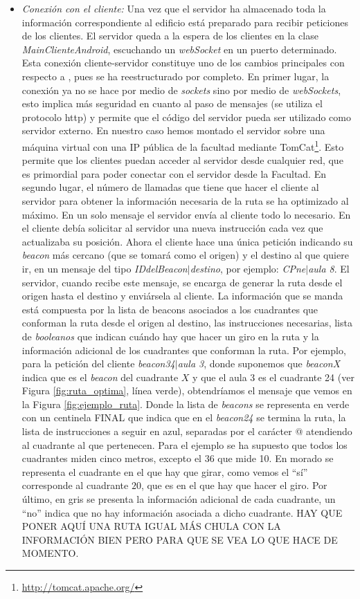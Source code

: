 \begin{itemize}
	\item \textit{Conexión con el cliente:} Una vez que el servidor ha almacenado toda la información correspondiente al edificio está preparado para recibir peticiones de los clientes. El servidor queda a la espera de los clientes en la clase \textit{MainClienteAndroid}, escuchando un \textit{webSocket} en un puerto determinado. Esta conexión cliente-servidor constituye uno de los cambios principales con respecto a \cite{TFGguia}, pues se ha reestructurado por completo. En primer lugar, la conexión ya no se hace por medio de \textit{sockets} sino por medio de \textit{webSockets}, esto implica más seguridad en cuanto al paso de mensajes (se utiliza el protocolo http) y permite que el código del servidor pueda ser utilizado como servidor externo. En nuestro caso hemos montado el servidor sobre una máquina virtual con una IP pública de la facultad mediante TomCat\footnote{\url{http://tomcat.apache.org/}}. Esto permite que los clientes puedan acceder al servidor desde cualquier red, que es primordial para poder conectar con el servidor desde la Facultad. En segundo lugar, el número de llamadas que tiene que hacer el cliente al servidor para obtener la información necesaria de la ruta se ha optimizado al máximo. En un solo mensaje el servidor envía al cliente todo lo necesario. En \cite{TFGguia} el cliente debía solicitar al servidor una nueva instrucción cada vez que actualizaba su posición. Ahora el cliente hace una única petición indicando su \textit{beacon} más cercano (que se tomará como el origen) y el destino al que quiere ir, en un mensaje del tipo \textit{IDdelBeacon$|$destino}, por ejemplo: \textit{CPne$|$aula 8}. El servidor, cuando recibe este mensaje, se encarga de generar la ruta desde el origen hasta el destino y enviársela al cliente. La información que se manda está compuesta por la lista de beacons asociados a los cuadrantes que conforman la ruta desde el origen al destino, las instrucciones necesarias, lista de \textit{booleanos} que indican cuándo hay que hacer un giro en la ruta y la información adicional de los cuadrantes que conforman la ruta. Por ejemplo, para la petición del cliente \textit{beacon34$|$aula 3}, donde suponemos que \textit{beaconX} indica que es el \textit{beacon} del cuadrante $X$ y que el aula 3 es el cuadrante 24 (ver Figura \ref{fig:ruta_optima}, línea verde), obtendríamos el mensaje que vemos en la Figura \ref{fig:ejemplo_ruta}. Donde la lista de \textit{beacons} se representa en verde con un centinela FINAL que indica que en el \textit{beacon24} se termina la ruta, la lista de instrucciones a seguir en azul, separadas por el carácter @ atendiendo al cuadrante al que pertenecen. Para el ejemplo se ha supuesto que todos los cuadrantes miden cinco metros, excepto el $36$ que mide 10. En morado se representa el cuadrante en el que hay que girar, como vemos el ``sí'' corresponde al cuadrante $20$, que es en el que hay que hacer el giro. Por último, en gris se presenta la información adicional de cada cuadrante, un ``no'' indica que no hay información asociada a dicho cuadrante. HAY QUE PONER AQUÍ UNA RUTA IGUAL MÁS CHULA CON LA INFORMACIÓN BIEN PERO PARA QUE SE VEA LO QUE HACE DE MOMENTO.
	

\end{itemize}
